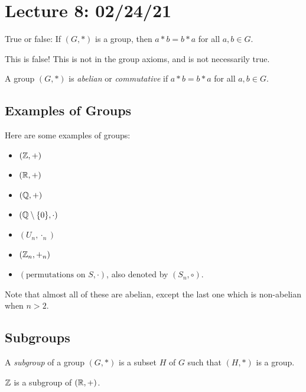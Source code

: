 \section{Lecture 8: 02/24/21}

\begin{question}
True or false: If $(G, *)$ is a group, then $a * b = b * a$ for all $a, b \in G$.
\end{question}

This is false! This is not in the group axioms, and is not necessarily true.

\begin{definition}[Abelian]
A group $(G, *)$ is \textit{abelian} or \textit{commutative} if $a*b=b*a$ for all $a,b\in G$.
\end{definition}

\subsection{Examples of Groups}

\begin{example}
Here are some examples of groups:
\begin{itemize}
    \item $(\mathbb{Z}, +)$
    \item $(\mathbb{R}, +)$
    \item $(\mathbb{Q}, +)$
    \item $(\mathbb{Q}\setminus \{0\}, \cdot)$
    \item $(U_n, \cdot_n)$
    \item $(\mathbb{Z}_n, +_n)$
    \item $(\text{permutations on }S, \cdot)$, also denoted by $(S_n, \circ)$.
\end{itemize}
Note that almost all of these are abelian, except the last one which is non-abelian when $n > 2$.
\end{example}

\subsection{Subgroups}

\begin{definition}[Subgroup]
A \textit{subgroup} of a group $(G, *)$ is a subset $H$ of $G$ such that $(H, *)$ is a group.
\end{definition}

\begin{example}
$\mathbb{Z}$ is a subgroup of $(\mathbb{R}, +)$.
\end{example}

